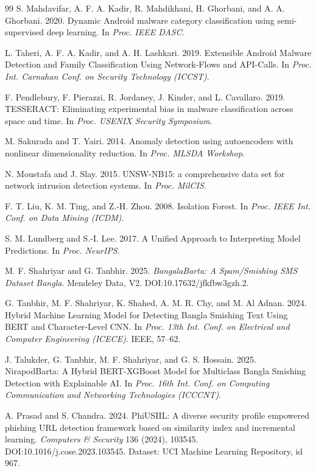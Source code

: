 \documentclass[preprint,12pt,number]{elsarticle}
\begin{document}
\begin{thebibliography}{99}
 S. Mahdavifar, A. F. A. Kadir, R. Mahdikhani, H. Ghorbani, and A. A. Ghorbani. 2020. Dynamic Android malware category classification using semi-supervised deep learning. In \emph{Proc. IEEE DASC}.

 L. Taheri, A. F. A. Kadir, and A. H. Lashkari. 2019. Extensible Android Malware Detection and Family Classification Using Network-Flows and API-Calls. In \emph{Proc. Int. Carnahan Conf. on Security Technology (ICCST)}.

 F. Pendlebury, F. Pierazzi, R. Jordaney, J. Kinder, and L. Cavallaro. 2019. TESSERACT: Eliminating experimental bias in malware classification across space and time. In \emph{Proc. USENIX Security Symposium}.

 M. Sakurada and T. Yairi. 2014. Anomaly detection using autoencoders with nonlinear dimensionality reduction. In \emph{Proc. MLSDA Workshop}.

 N. Moustafa and J. Slay. 2015. UNSW-NB15: a comprehensive data set for network intrusion detection systems. In \emph{Proc. MilCIS}.

 F. T. Liu, K. M. Ting, and Z.-H. Zhou. 2008. Isolation Forest. In \emph{Proc. IEEE Int. Conf. on Data Mining (ICDM)}.

 S. M. Lundberg and S.-I. Lee. 2017. A Unified Approach to Interpreting Model Predictions. In \emph{Proc. NeurIPS}.

 M. F. Shahriyar and G. Tanbhir. 2025. \emph{BangalaBarta: A Spam/Smishing SMS Dataset Bangla}. Mendeley Data, V2. DOI:10.17632/jfkfbw3gzh.2.

 G. Tanbhir, M. F. Shahriyar, K. Shahed, A. M. R. Chy, and M. Al Adnan. 2024. Hybrid Machine Learning Model for Detecting Bangla Smishing Text Using BERT and Character-Level CNN. In \emph{Proc. 13th Int. Conf. on Electrical and Computer Engineering (ICECE)}. IEEE, 57--62.

 J. Talukder, G. Tanbhir, M. F. Shahriyar, and G. S. Hossain. 2025. NirapodBarta: A Hybrid BERT-XGBoost Model for Multiclass Bangla Smishing Detection with Explainable AI. In \emph{Proc. 16th Int. Conf. on Computing Communication and Networking Technologies (ICCCNT)}.


 A. Prasad and S. Chandra. 2024. PhiUSIIL: A diverse security profile empowered phishing URL detection framework based on similarity index and incremental learning. \emph{Computers \& Security} 136 (2024), 103545. DOI:10.1016/j.cose.2023.103545. Dataset: UCI Machine Learning Repository, id 967.

\end{thebibliography}
\end{document}

